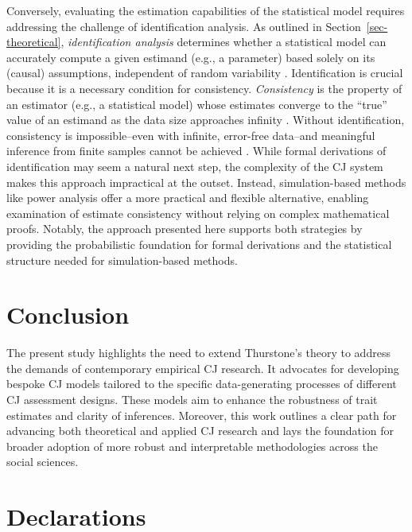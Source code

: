 \documentclass[
  authoryear,
  review,
  1p]{elsarticle}
\begin{document}
Conversely, evaluating the estimation capabilities of the statistical
model requires addressing the challenge of identification analysis. As
outlined in Section~\ref{sec-theoretical}, \emph{identification
analysis} determines whether a statistical model can accurately compute
a given estimand (e.g., a parameter) based solely on its (causal)
assumptions, independent of random variability
\citep{Schuessler_et_al_2023}. Identification is crucial because it is a
necessary condition for consistency. \emph{Consistency} is the property
of an estimator (e.g., a statistical model) whose estimates converge to
the ``true'' value of an estimand as the data size approaches infinity
\citep{Everitt_et_al_2010}. Without identification, consistency is
impossible--even with infinite, error-free data--and meaningful
inference from finite samples cannot be achieved
\citep{Schuessler_et_al_2023}. While formal derivations of
identification may seem a natural next step, the complexity of the CJ
system makes this approach impractical at the outset. Instead,
simulation-based methods like power analysis offer a more practical and
flexible alternative, enabling examination of estimate consistency
without relying on complex mathematical proofs. Notably, the approach
presented here supports both strategies by providing the probabilistic
foundation for formal derivations and the statistical structure needed
for simulation-based methods.

\section{Conclusion}\label{sec-conclusion}

The present study highlights the need to extend Thurstone's theory to
address the demands of contemporary empirical CJ research. It advocates
for developing bespoke CJ models tailored to the specific
data-generating processes of different CJ assessment designs. These
models aim to enhance the robustness of trait estimates and clarity of
inferences. Moreover, this work outlines a clear path for advancing both
theoretical and applied CJ research and lays the foundation for broader
adoption of more robust and interpretable methodologies across the
social sciences.

\newpage{}

\section*{Declarations}\label{declarations}
\end{document}
